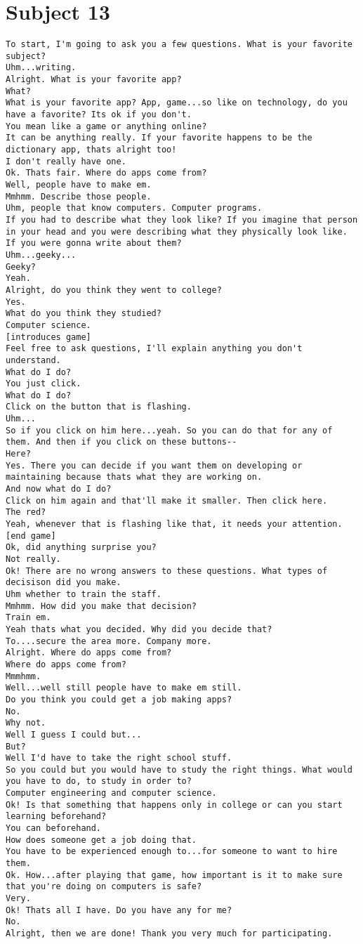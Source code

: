 \clearpage\section*{Subject 13}
\begin{lstlisting}
To start, I'm going to ask you a few questions. What is your favorite subject?
Uhm...writing.
Alright. What is your favorite app?
What?
What is your favorite app? App, game...so like on technology, do you have a favorite? Its ok if you don't.
You mean like a game or anything online?
It can be anything really. If your favorite happens to be the dictionary app, thats alright too!
I don't really have one.
Ok. Thats fair. Where do apps come from? 
Well, people have to make em.
Mmhmm. Describe those people.
Uhm, people that know computers. Computer programs.
If you had to describe what they look like? If you imagine that person in your head and you were describing what they physically look like. If you were gonna write about them?
Uhm...geeky...
Geeky?
Yeah.
Alright, do you think they went to college?
Yes.
What do you think they studied?
Computer science. 
[introduces game]
Feel free to ask questions, I'll explain anything you don't understand.
What do I do?
You just click.
What do I do?
Click on the button that is flashing.
Uhm...
So if you click on him here...yeah. So you can do that for any of them. And then if you click on these buttons--
Here?
Yes. There you can decide if you want them on developing or maintaining because thats what they are working on.
And now what do I do?
Click on him again and that'll make it smaller. Then click here.
The red?
Yeah, whenever that is flashing like that, it needs your attention.
[end game]
Ok, did anything surprise you?
Not really.
Ok! There are no wrong answers to these questions. What types of decisison did you make.
Uhm whether to train the staff.
Mmhmm. How did you make that decision?
Train em.
Yeah thats what you decided. Why did you decide that?
To....secure the area more. Company more.
Alright. Where do apps come from?
Where do apps come from?
Mmmhmm.
Well...well still people have to make em still.
Do you think you could get a job making apps?
No.
Why not.
Well I guess I could but...
But?
Well I'd have to take the right school stuff.
So you could but you would have to study the right things. What would you have to do, to study in order to?
Computer engineering and computer science.
Ok! Is that something that happens only in college or can you start learning beforehand?
You can beforehand.
How does someone get a job doing that.
You have to be experienced enough to...for someone to want to hire them.
Ok. How...after playing that game, how important is it to make sure that you're doing on computers is safe?
Very.
Ok! Thats all I have. Do you have any for me?
No.
Alright, then we are done! Thank you very much for participating.
\end{lstlisting}